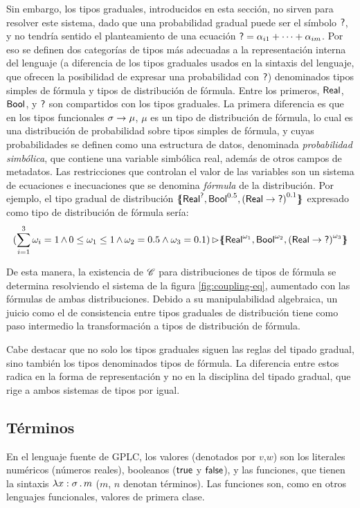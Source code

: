 Sin embargo, los tipos graduales, introducidos en esta sección, no sirven para resolver este sistema, dado que una probabilidad gradual puede ser el símbolo $\mathord{\text{\sffamily ?}}$, y no tendría sentido el planteamiento de una ecuación $\mathord{\text{\sffamily ?}} = \alpha_{i1} + \cdots + \alpha_{im}$. Por eso se definen dos categorías de tipos más adecuadas a la representación interna del lenguaje (a diferencia de los tipos graduales usados en la sintaxis del lenguaje, que ofrecen la posibilidad de expresar una probabilidad con $\mathord{\text{\sffamily ?}}$) denominados tipos simples de fórmula y tipos de distribución de fórmula. Entre los primeros, $\mathord{\text{\sffamily Real}}$, $\mathord{\text{\sffamily Bool}}$, y $\mathord{\text{\sffamily ?}}$ son compartidos con los tipos graduales. La primera diferencia es que en los tipos funcionales $\sigma \to \mu$, $\mu$ es un tipo de distribución de fórmula, lo cual es una distribución de probabilidad sobre tipos simples de fórmula, y cuyas probabilidades se definen como una estructura de datos, denominada \emph{probabilidad simbólica}, que contiene una variable simbólica real, además de otros campos de metadatos. Las restricciones que controlan el valor de las variables son un sistema de ecuaciones e inecuaciones que se denomina \emph{fórmula} de la distribución. Por ejemplo, el tipo gradual de distribución $\{\mskip-7mu\{ {\mathord{\text{\sffamily Real}}^{\mathord{\text{\sffamily ?}}} , \mathord{\text{\sffamily Bool}}^{0.5}, {(\mathord{\text{\sffamily Real}} \to \mathord{\text{\sffamily ?}})}^{0.1}} \}\mskip-7mu\}$ expresado como tipo de distribución de fórmula sería:
\begin{equation*}
  \label{eq:form}
  (\sum_{i=1}^{3}\omega_i=1
  \mathop{\land}
  0\leq\omega_1\leq 1 \mathop{\land} \omega_2 = 0.5 \land \omega_3 = 0.1)
  \mathop{\rhd} \{\mskip-7mu\{ {\mathord{\text{\sffamily Real}} ^ {\omega_1}, \mathord{\text{\sffamily Bool}}^{\omega_2}, {(\mathord{\text{\sffamily Real}} \to \mathord{\text{\sffamily ?}})}^{\omega_3}} \}\mskip-7mu\}  
\end{equation*}


De esta manera, la existencia de $\mathscr{C}$ para distribuciones de
tipos de fórmula se determina resolviendo el sistema de la figura
\ref{fig:coupling-eq}, aumentado con las fórmulas de ambas
distribuciones. Debido a su manipulabilidad algebraica, un juicio como
el de consistencia entre tipos graduales de distribución tiene como
paso intermedio la transformación a tipos de distribución de fórmula.

Cabe destacar que no solo los tipos graduales siguen las reglas del
tipado gradual, sino también los tipos denominados tipos de
fórmula. La diferencia entre estos radica en la forma de
representación y no en la disciplina del tipado gradual, que rige a
ambos sistemas de tipos por igual.



\subsection{Términos}\label{par:source-term} En el lenguaje fuente de
GPLC, los valores (denotados por $v$,$w$) son los literales numéricos
(números reales), booleanos ($\mathord{\text{\sffamily true}}$ y $\mathord{\text{\sffamily false}}$), y las funciones, que
tienen la sintaxis $\lambda {x} : {\sigma} \,.\, {m}$ ($m$, $n$ denotan
términos). Las funciones son, como en otros lenguajes funcionales,
valores de primera clase.



